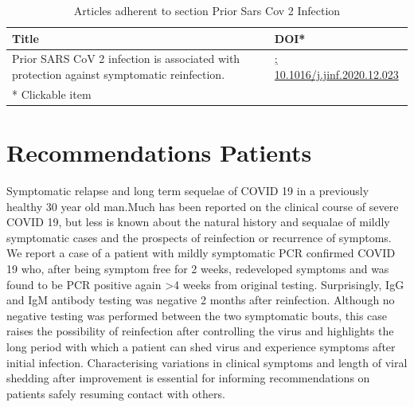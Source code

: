 \documentclass{qqtarticle}
\begin{document}
        \begin{table}[H]
        \scriptsize
        \centering
        \caption{Articles adherent to section Prior Sars Cov 2 Infection}
        \renewcommand{\arraystretch}{1.5}
        \begin{tabular}{p{}l}
            \toprule 
            Title & DOI* \\     \midrule Prior SARS CoV 2 infection is associated with protection against symptomatic reinfection. \cite{PriorSARSd192fef2} & \href{https://dx.doi.org/; 10.1016/j.jinf.2020.12.023}{; 10.1016/j.jinf.2020.12.023}\\     \midrule
            * Clickable item \\
            \bottomrule
        \end{tabular}
        \label{tab:topic9}
        \end{table}\section{Recommendations Patients}
            Symptomatic relapse and long term sequelae of COVID 19 in a previously healthy 30 year old man.Much has been reported on the clinical course of severe COVID 19, but less is known about the natural history and sequalae of mildly symptomatic cases and the prospects of reinfection or recurrence of symptoms. We report a case of a patient with mildly symptomatic PCR confirmed COVID 19 who, after being symptom free for 2 weeks, redeveloped symptoms and was found to be PCR positive again >4 weeks from original testing. Surprisingly, IgG and IgM antibody testing was negative 2 months after reinfection. Although no negative testing was performed between the two symptomatic bouts, this case raises the possibility of reinfection after controlling the virus and highlights the long period with which a patient can shed virus and experience symptoms after initial infection. Characterising variations in clinical symptoms and length of viral shedding after improvement is essential for informing recommendations on patients safely resuming contact with others.
\end{document}
